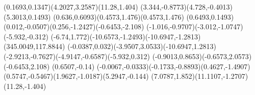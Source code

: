 {    \rcurveto(0.1693,0.1347)(4.2027,3.2587)(11.28,1.404)
    \rcurveto(3.344,-0.8773)(4.728,-0.4013)(5.3013,0.1493)
    \rcurveto(0.636,0.6093)(0.4573,1.476)(0.4573,1.476)
    \rlineto(0.6493,0.1493)
    \rcurveto(0.012,-0.0507)(0.256,-1.2427)(-0.6453,-2.108)
    \rcurveto(-1.016,-0.9707)(-3.012,-1.0747)(-5.932,-0.312)
    \rcurveto(-6.74,1.772)(-10.6573,-1.2493)(-10.6947,-1.2813)
    \closepath
    \moveto(345.0049,117.8844)
    \rcurveto(-0.0387,0.032)(-3.9507,3.0533)(-10.6947,1.2813)
    \rcurveto(-2.9213,-0.7627)(-4.9147,-0.6587)(-5.932,0.312)
    \rcurveto(-0.9013,0.8653)(-0.6573,2.0573)(-0.6453,2.108)
    \rlineto(0.6507,-0.14)
    \rcurveto(-0.0067,-0.0333)(-0.1733,-0.8893)(0.4627,-1.4907)
    \rcurveto(0.5747,-0.5467)(1.9627,-1.0187)(5.2947,-0.144)
    \rcurveto(7.0787,1.852)(11.1107,-1.2707)(11.28,-1.404)
    \closepath
}
